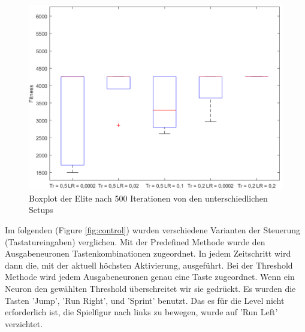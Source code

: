 \documentclass{hbrs-ecta-report}
\begin{document}
\begin{figure}[h!]
	\centering
	\includegraphics[width=\linewidth]{img/Mario_Treshold_boxplot.png}
	\caption{Boxplot der Elite nach 500 Iterationen von den unterschiedlichen Setups}
	\label{fig:treshold_boxplot} 
\end{figure}

\FloatBarrier

Im folgenden (Figure \ref{fig:control}) wurden verschiedene Varianten der Steuerung (Tastatureingaben) verglichen.
Mit der Predefined Methode wurde den Ausgabeneuronen Tastenkombinationen zugeordnet. In jedem Zeitschritt wird dann die, mit der aktuell höchsten Aktivierung, ausgeführt.
Bei der Threshold Methode wird jedem Ausgabeneuronen genau eine Taste zugeordnet. Wenn ein Neuron den gewählten Threshold überschreitet wir sie gedrückt. \newline
Es wurden die Tasten 'Jump', 'Run Right', und 'Sprint' benutzt. Das es für die Level nicht erforderlich ist, die Spielfigur nach links zu bewegen, wurde auf 'Run Left' verzichtet. \newline
\end{document}
